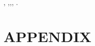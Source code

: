 \documentclass[a4paper]{article}
\begin{document}
\cite{Antonio04_NewPRM},
\cite{Kavraki02_Random_ConfigurationSpace_PP},\cite{Cai87_SpatialMotion_PointContact},\cite{Holland75_GAMethod},
\cite{Alouges10_MotionPlanning_RollingBody}.
\cite{Barraquand91_MP_DisctributedRepresenation}
\cleardoublepage
\normalem
\printbibliography 

%
%


\cleardoublepage
\appendix
\section{APPENDIX}
\label{appendix:A}
%
%
\end{document}
